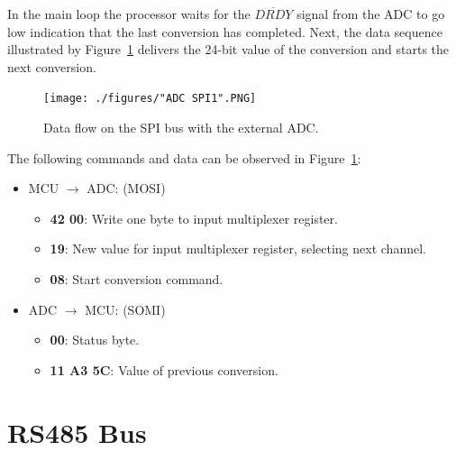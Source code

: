 In the main loop the processor waits for the $\overline{DRDY}$ signal from the ADC to go low indication that the last conversion has completed. Next, the data sequence illustrated by Figure~\ref{fig:adc_spi} delivers the 24-bit value of the conversion and starts the next conversion.

\begin{figure}[H]
    \centering \texttt{[image: ./figures/"ADC SPI1".PNG]}
    \caption{Data flow on the SPI bus with the external ADC.}
    \label{fig:adc_spi}
\end{figure}

The following commands and data can be observed in Figure~\ref{fig:adc_spi}:

\begin{itemize}
    \item MCU $\rightarrow$ ADC: (MOSI)
    \begin{itemize}
        \item \textbf{42 00}: Write one byte to input multiplexer register.
        \item \textbf{19}: New value for input multiplexer register, selecting next channel.
        \item \textbf{08}: Start conversion command.
    \end{itemize}
    \item ADC $\rightarrow$ MCU: (SOMI)
    \begin{itemize}
        \item \textbf{00}: Status byte.
        \item \textbf{11 A3 5C}: Value of previous conversion.
    \end{itemize}
\end{itemize}

\section{RS485 Bus}

